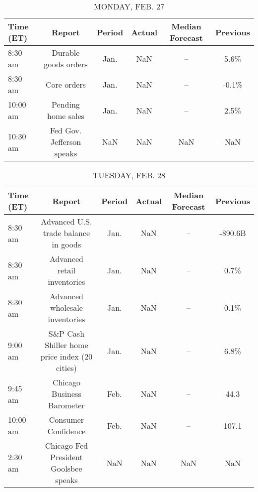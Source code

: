 \documentclass{article}%
\begin{document}
%
\normalsize%


\begin{table}[htbp]%
\caption{MONDAY, FEB. 27}%
\centering%
\begin{adjustbox}{width=1\textwidth}%
\begin{tabular}{lccccc}
\toprule
Time (ET) &                    Report & Period & Actual & Median Forecast & Previous \\
\midrule
  8:30 am &      Durable goods orders &   Jan. &    NaN &              -- &     5.6\% \\
  8:30 am &               Core orders &   Jan. &    NaN &              -- &    -0.1\% \\
 10:00 am &        Pending home sales &   Jan. &    NaN &              -- &     2.5\% \\
 10:30 am & Fed Gov. Jefferson speaks &    NaN &    NaN &             NaN &      NaN \\
\bottomrule
\end{tabular}
%
\end{adjustbox}%
\end{table}

%


\begin{table}[htbp]%
\caption{TUESDAY, FEB. 28}%
\centering%
\begin{adjustbox}{width=1\textwidth}%
\begin{tabular}{lccccc}
\toprule
Time (ET) &                                        Report & Period & Actual & Median Forecast & Previous \\
\midrule
  8:30 am &          Advanced U.S. trade balance in goods &   Jan. &    NaN &              -- &  -\$90.6B \\
  8:30 am &                   Advanced retail inventories &   Jan. &    NaN &              -- &     0.7\% \\
  8:30 am &                Advanced wholesale inventories &   Jan. &    NaN &              -- &     0.1\% \\
  9:00 am & S\&P Cash Shiller home price index (20 cities) &   Jan. &    NaN &              -- &     6.8\% \\
  9:45 am &                    Chicago Business Barometer &   Feb. &    NaN &              -- &     44.3 \\
 10:00 am &                           Consumer Confidence &   Feb. &    NaN &              -- &    107.1 \\
  2:30 am &         Chicago Fed President Goolsbee speaks &    NaN &    NaN &             NaN &      NaN \\
\bottomrule
\end{tabular}
%
\end{adjustbox}%
\end{table}
\end{document}
